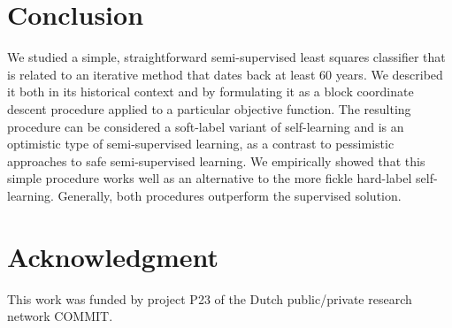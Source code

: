 \documentclass[conference,a4paper,10pt]{IEEEtran}\usepackage[]{graphicx}\usepackage[]{color}
\begin{document}
\section{Conclusion}
We studied a simple, straightforward semi-supervised least squares classifier that is related to an iterative method that dates back at least 60 years. We described it both in its historical context and by formulating it as a block coordinate descent procedure applied to a particular objective function. The resulting procedure can be considered a soft-label variant of self-learning and is an optimistic type of semi-supervised learning, as a contrast to pessimistic approaches to safe semi-supervised learning. We empirically showed that this simple procedure works well as an alternative to the more fickle hard-label self-learning. Generally, both procedures outperform the supervised solution.

\section*{Acknowledgment}
This work was funded by project P23 of the Dutch public/private research network COMMIT.
\end{document}
